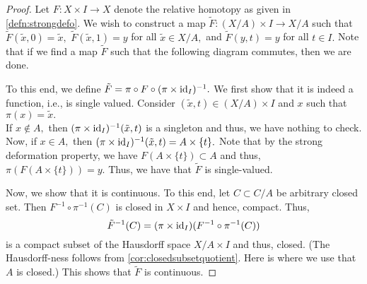 \documentclass[12pt]{article}
\begin{document}
\begin{proof} 
	Let $F:X \times I \to X$ denote the relative homotopy as given in \cref{defn:strongdefo}. We wish to construct a map $\tilde{F}:(X/A)\times I \to X/A$ such that $\tilde{F}(\tilde{x}, 0) = \tilde{x},$ $\tilde{F}(\tilde{x}, 1) = y$ for all $\tilde{x} \in X/A,$ and $\tilde{F}(y, t) = y$ for all $t \in I.$ Note that if we find a map $\tilde{F}$ such that the following diagram commutes, then we are done.

	\begin{center}
	\end{center}

	To this end, we define $\tilde{F} = \pi\circ F \circ (\pi \times \operatorname{id}_I)^{-1}.$ We first show that it is indeed a function, i.e., is single valued. Consider $(\tilde{x}, t) \in (X/A)\times I$ and $x$ such that $\pi(x) = \tilde{x}.$ \\
	If $x \notin A,$ then $(\pi\times\operatorname{id}_I)^{-1}(\tilde{x}, t)$ is a singleton and thus, we have nothing to check.\\
	Now, if $x \in A,$ then $(\pi\times\operatorname{id}_I)^{-1}(\tilde{x}, t) = A\times\{t\}.$ Note that by the strong deformation property, we have $F(A\times\{t\}) \subset A$ and thus, $\pi(F(A\times\{t\})) = y.$ Thus, we have that $\tilde{F}$ is single-valued.

	Now, we show that it is continuous. To this end, let $C \subset C/A$ be  arbitrary closed set. Then $F^{-1}\circ\pi^{-1}(C)$ is closed in $X\times I$ and hence, compact. Thus,
	\begin{equation*} 
		\tilde{F}^{-1}(C) = (\pi\times \operatorname{id}_I)(F^{-1}\circ\pi^{-1}(C))
	\end{equation*}
	is a compact subset of the Hausdorff space $X/A\times I$ and thus, closed. (The Hausdorff-ness follows from \cref{cor:closedsubsetquotient}. Here is where we use that $A$ is closed.) This shows that $\tilde{F}$ is continuous.
\end{proof}
\end{document}
